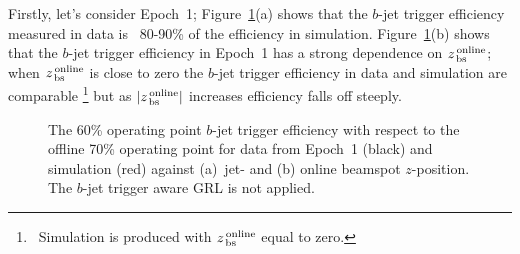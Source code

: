 \newpage

Firstly, let's consider Epoch~1;
Figure~\ref{fig:Epoch1_eff}(a) shows that the $b$-jet trigger efficiency measured in data is ~80-90\% of the efficiency in simulation.
Figure~\ref{fig:Epoch1_eff}(b) shows that the $b$-jet trigger efficiency in Epoch~1 has a strong dependence on $z_{\,\text{bs}}^{\text{\,online}}$;
when $z_{\,\text{bs}}^{\text{\,online}}$ is close to zero the $b$-jet trigger efficiency in data and simulation are comparable
\footnote{\ Simulation is produced with $z_{\,\text{bs}}^{\text{\,online}}$ equal to zero.}
but as $|z_{\,\text{bs}}^{\text{\,online}}|$ increases efficiency falls off steeply.

\begin{figure}[!htb]
  \begin{center}
    \captionsetup[subfigure]{aboveskip=0pt,justification=centering}
  \end{center}
  \vspace{-1em}
  \caption[The $b$-jet trigger efficiency 
    for data from Epoch~1 and simulation against jet-\pT{} and online beamspot $z$-position.
    The $b$-jet trigger aware GRL is not applied.]
          {The 60\% operating point $b$-jet trigger efficiency with respect to the offline 70\% operating point
            for data from Epoch~1 (black) and simulation (red) against (a)~jet-\pT{} and (b) online beamspot $z$-position.
            The $b$-jet trigger aware GRL is not applied.}
          \label{fig:Epoch1_eff}
            \vspace{-0.5em}

\end{figure}

